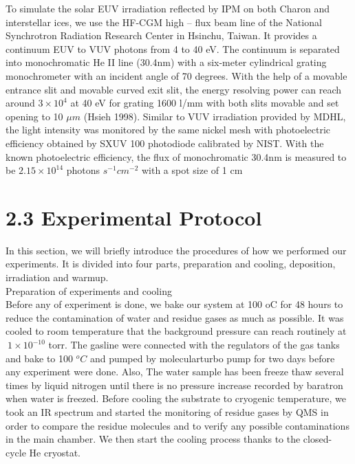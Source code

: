 To simulate the solar EUV irradiation reflected by IPM on both Charon and interstellar ices, we use the HF-CGM high – flux beam line of the National Synchrotron Radiation Research Center in Hsinchu, Taiwan. It provides a continuum EUV to VUV photons from 4 to 40 eV. The continuum is separated into monochromatic He II line (30.4nm) with a six-meter cylindrical grating monochrometer with an incident angle of 70 degrees. With the help of a movable entrance slit and movable curved exit slit, the energy resolving power can reach around $3 \times 10^4$ at 40 eV for grating 1600 l/mm with both slits movable and set opening to 10 $\mu m$ (Hsieh 1998). Similar to VUV irradiation provided by MDHL, the light intensity was monitored by the same nickel mesh with photoelectric efficiency obtained by SXUV 100 photodiode calibrated by NIST. With the known photoelectric efficiency, the flux of monochromatic 30.4nm is measured to be $2.15 \times 10^{14}$ photons $s^{-1} cm^{-2}$ with a spot size of 1 cm%

\section{2.3 Experimental Protocol}

In this section, we will briefly introduce the  procedures of how we performed our experiments. It is divided into four parts, preparation and cooling, deposition, irradiation and warmup.\\

Preparation of experiments and cooling\\
Before any of experiment is done, we bake our system at 100 oC for 48 hours to reduce the contamination of water and residue gases as much as possible. It was cooled to room temperature that the background pressure can reach routinely at $~ 1 \times 10^{-10}$ torr. The gasline were connected with the regulators of the gas tanks and bake to 100 $^oC$ and pumped by molecularturbo pump for two days before any experiment were done. Also, The water sample has been freeze thaw several times by liquid nitrogen until there is no pressure increase recorded by baratron when water is freezed. Before cooling the substrate to cryogenic temperature, we took an IR spectrum and started the monitoring of residue gases by QMS in order to compare the residue molecules and to verify any possible contaminations in the main chamber. We then start the cooling process thanks to the closed-cycle He cryostat.\\

